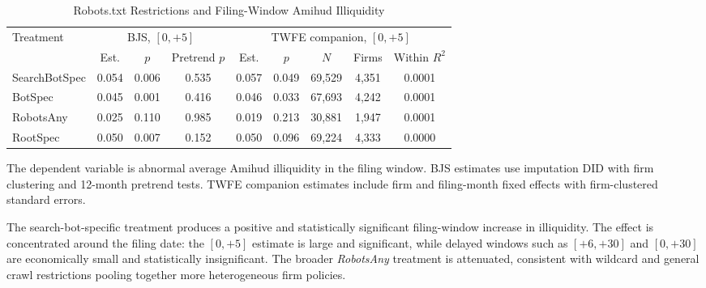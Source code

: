 \begin{table}[!htbp]
\centering
\caption{Robots.txt Restrictions and Filing-Window Amihud Illiquidity}
\label{tab:robots_amihud_main}
\begin{threeparttable}
\begin{tabular}{lcccccccc}
\toprule
Treatment &
\multicolumn{3}{c}{BJS, \([0,+5]\)} &
\multicolumn{5}{c}{TWFE companion, \([0,+5]\)} \\
\cmidrule(lr){2-4}\cmidrule(lr){5-9}
& Est. & \(p\) & Pretrend \(p\)
& Est. & \(p\) & \(N\) & Firms & Within \(R^2\) \\
\midrule
SearchBotSpec & 0.054 & 0.006 & 0.535 & 0.057 & 0.049 & 69,529 & 4,351 & 0.0001 \\
BotSpec       & 0.045 & 0.001 & 0.416 & 0.046 & 0.033 & 67,693 & 4,242 & 0.0001 \\
RobotsAny     & 0.025 & 0.110 & 0.985 & 0.019 & 0.213 & 30,881 & 1,947 & 0.0001 \\
RootSpec      & 0.050 & 0.007 & 0.152 & 0.050 & 0.096 & 69,224 & 4,333 & 0.0000 \\
\bottomrule
\end{tabular}
\begin{tablenotes}[flushleft]\footnotesize
\item The dependent variable is abnormal average Amihud illiquidity in the
filing window.  BJS estimates use imputation DID with firm clustering and
12-month pretrend tests.  TWFE companion estimates include firm and
filing-month fixed effects with firm-clustered standard errors.
\end{tablenotes}
\end{threeparttable}
\end{table}

The search-bot-specific treatment produces a positive and statistically
significant filing-window increase in illiquidity.  The effect is
concentrated around the filing date: the \([0,+5]\) estimate is large and
significant, while delayed windows such as \([+6,+30]\) and \([0,+30]\)
are economically small and statistically insignificant.  The broader
\textit{RobotsAny} treatment is attenuated, consistent with wildcard and
general crawl restrictions pooling together more heterogeneous firm
policies.

